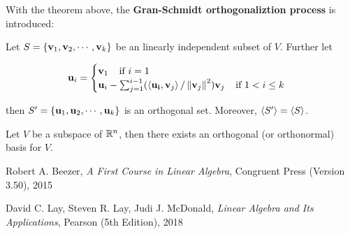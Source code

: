 \documentclass[a4paper,12pt]{article}
\begin{document}
With the theorem above, the \textbf{Gran-Schmidt orthogonaliztion process} is introduced:

\begin{thm}
  Let $S=\left\{ \mathbf{v}_{1},\mathbf{v}_{2},\cdots,\mathbf{v}_{k}\right\}$ be an linearly independent subset of $V$. Further let

  $$\mathbf{u}_{i}=\begin{cases}
    \mathbf{v}_{1}\;\;\;\;\text{if }i=1\\
    \mathbf{u}_{i}-\sum_{j=1}^{i-1}(\left\langle \mathbf{u_{i}},\mathbf{v}_{j}\right\rangle/\left\| \mathbf{v}_{j}\right\|^{2})\mathbf{v}_{j}\;\;\;\;\text{if }1<i\leq k
  \end{cases}$$\s

  then $S'=\left\{ \mathbf{u}_{1},\mathbf{u}_{2},\cdots,\mathbf{u}_{k}\right\}$ is an orthogonal set. Moreover, $\left\langle S'\right\rangle=\left\langle S\right\rangle$.
\end{thm}\n

\begin{crl}
  Let $V$ be a subspace of $\mathbb{R}^{n}$, then there exists an orthogonal (or orthonormal) basis for $V$.
\end{crl}



\begin{reflist}
  \item Robert A. Beezer, \textit{A First Course in Linear Algebra}, Congruent Press (Version 3.50), 2015
  \item David C. Lay, Steven R. Lay, Judi J. McDonald, \textit{Linear Algebra and Its Applications}, Pearson (5th Edition), 2018
\end{reflist}
\end{document}
